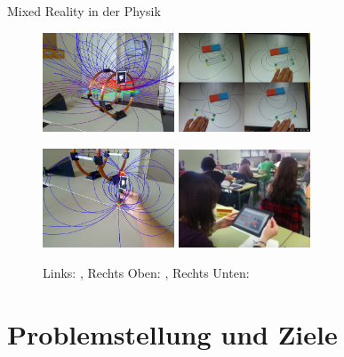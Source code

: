 \begin{frame}[fragile]{Mixed Reality in der Physik}

\begin{figure}
	\includegraphics[width=0.35\textwidth]{images/Buchau09.jpg}
	\hspace{0.05cm}
	\includegraphics[width=0.35\textwidth]{images/Matsutomo13.jpg}

	\includegraphics[width=0.35\textwidth]{images/Buchau09_Magnet.jpg}
	\hspace{0.05cm}
	\includegraphics[width=0.35\textwidth]{images/Ibanez14.jpg}

	\setlength{\abovecaptionskip}{5pt plus 5pt minus 2pt}
	\caption*{Links: \citep{Buchau09}, Rechts Oben: \cite{Matsutomo13}, Rechts Unten: \cite{Ibanez14}}
\end{figure}

\end{frame}

\part{Problemstellung und Ziele}
\label{part:golas}

